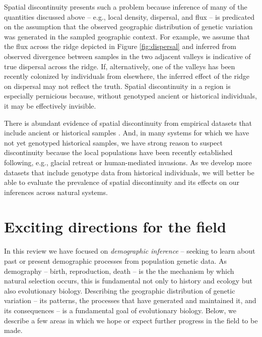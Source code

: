 \documentclass{ar-1col}
\renewcommand{\emph}[1]{{\textit{#1}}}
\begin{document}
Spatial discontinuity presents such a problem because 
inference of many of the quantities discussed above --  
e.g., local density, dispersal, and flux --
is predicated on the assumption that 
the observed geographic distribution of genetic variation 
was generated in the sampled geographic context.
For example, 
we assume that the flux across the ridge 
depicted in Figure \ref{fig:dispersal}
and inferred from observed divergence 
between samples in the two adjacent valleys 
is indicative of true dispersal across the ridge.
If, alternatively, one of the valleys 
has been recently colonized by individuals from elsewhere, 
the inferred effect of the ridge on dispersal may not reflect the truth.
Spatial discontinuity in a region is especially pernicious because, 
without genotyped ancient or historical individuals, 
it may be effectively invisible.

There is abundant evidence of spatial discontinuity 
from empirical datasets that include ancient or historical samples 
\citep{bi2013unlocking, skoglund2014investigating, PickrellReich2014, lazaridis_ancient_2014, haak2015massive, allentoft2015population, joseph2018inference}.
And, in many systems for which we have not yet genotyped historical samples, 
we have strong reason to suspect discontinuity 
because the local populations have been recently established 
following, e.g., glacial retreat or human-mediated invasions.
As we develop more datasets that include genotype data from historical individuals, 
we will better be able to evaluate the prevalence of spatial discontinuity 
and its effects on our inferences across natural systems. 


\section{Exciting directions for the field}

In this review we have focused on \emph{demographic inference} --
seeking to learn about past or present demographic processes
from population genetic data.
As demography -- birth, reproduction, death -- 
is the the mechanism by which natural selection occurs,
this is fundamental not only to history and ecology but also evolutionary biology.
Describing the geographic distribution of genetic variation -- 
its patterns, 
the processes that have generated and maintained it, 
and its consequences -- 
is a fundamental goal of evolutionary biology.
Below, we describe a few areas 
in which we hope or expect further progress in the field to be made.
\end{document}
